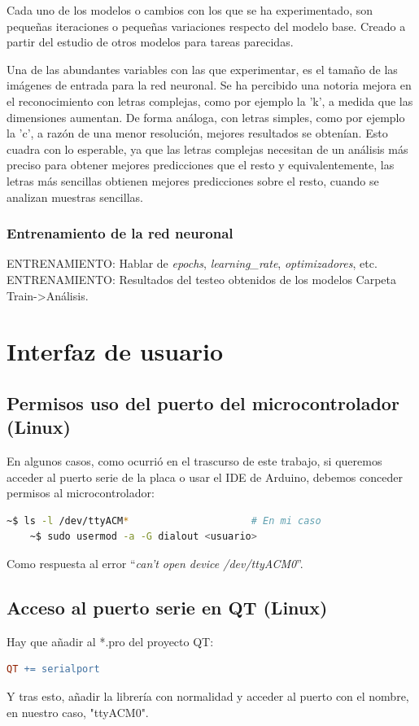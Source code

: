 \begin{appendices}
Cada uno de los modelos o cambios con los que se ha experimentado, son
pequeñas iteraciones o pequeñas variaciones respecto del modelo base.
Creado a partir del estudio de otros modelos para tareas parecidas.

Una de las abundantes variables con las que experimentar, es el
tamaño de las imágenes de entrada para la red neuronal. Se ha
percibido una notoria mejora en el reconocimiento con letras
complejas, como por ejemplo la 'k', a medida que las dimensiones aumentan. 
De forma análoga, con letras simples, como por ejemplo la 'c', a razón de
una menor resolución, mejores resultados se obtenían. Esto cuadra con lo
esperable, ya que las letras complejas necesitan de un análisis más preciso
para obtener mejores predicciones que el resto y equivalentemente, las letras
más sencillas obtienen mejores predicciones sobre el resto, cuando se analizan
muestras sencillas.

\subsection{Entrenamiento de la red neuronal\label{expTrainRN}}
{\color{red} ENTRENAMIENTO: Hablar de \textit{epochs}, \textit{learning\_rate},
\textit{optimizadores}, etc.}
{\color{red} ENTRENAMIENTO: Resultados del testeo obtenidos de los modelos
Carpeta Train->Análisis.}


\chapter{Interfaz de usuario}
\section{Permisos uso del puerto del microcontrolador (Linux)\label{pserie}}
En algunos casos, como ocurrió en el trascurso de este trabajo,
si queremos acceder al puerto serie de la placa o usar el IDE de
Arduino, debemos conceder permisos al microcontrolador:
\begin{lstlisting}[language=bash]
    ~$ ls -l /dev/ttyACM*                     # En mi caso
    ~$ sudo usermod -a -G dialout <usuario>
\end{lstlisting}

Como respuesta al error ``\textit{can't open device /dev/ttyACM0}''.


\section{Acceso al puerto serie en QT (Linux)\label{psQT}}
Hay que añadir al *.pro del proyecto QT:
\begin{lstlisting}[language=make]
  QT += serialport
\end{lstlisting}
Y tras esto, añadir la librería con normalidad y acceder al puerto
con el nombre, en nuestro caso, "ttyACM0".


\end{appendices}
